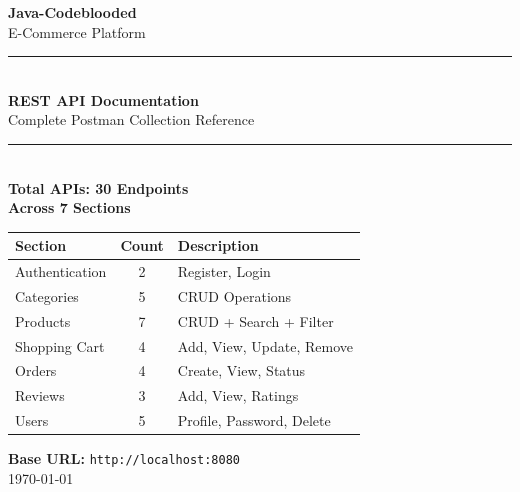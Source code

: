 \documentclass[12pt, a4paper]{article}
\begin{document}
\begin{titlepage}
    \centering
    \vspace*{2cm}
    
    {\Huge\bfseries\color{darkblue} Java-Codeblooded\\[0.3cm]}
    {\LARGE\color{primaryblue} E-Commerce Platform\\[0.5cm]}
    
    \rule{\textwidth}{1.5pt}\\[0.5cm]
    
    {\Huge\bfseries REST API Documentation\\[0.3cm]}
    {\Large Complete Postman Collection Reference\\[1cm]}
    
    \rule{\textwidth}{1.5pt}\\[2cm]
    
    {\Large\textbf{Total APIs: 30 Endpoints}}\\[0.5cm]
    {\Large\textbf{Across 7 Sections}}\\[2cm]
    
    \begin{tabular}{|l|c|l|}
        \hline
        \textbf{Section} & \textbf{Count} & \textbf{Description} \\
        \hline
        Authentication & 2 & Register, Login \\
        Categories & 5 & CRUD Operations \\
        Products & 7 & CRUD + Search + Filter \\
        Shopping Cart & 4 & Add, View, Update, Remove \\
        Orders & 4 & Create, View, Status \\
        Reviews & 3 & Add, View, Ratings \\
        Users & 5 & Profile, Password, Delete \\
        \hline
    \end{tabular}
    
    \vfill
    
    {\large\textbf{Base URL:} \texttt{http://localhost:8080}}\\[0.5cm]
    {\large\today}
    
\end{titlepage}

\tableofcontents
\newpage

\end{document}
